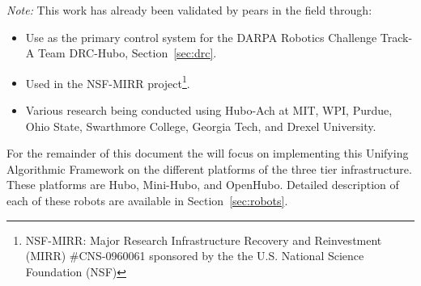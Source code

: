 \noindent \textit{Note:} This work has already been validated by pears in the field through:
\begin{itemize}
\item Use as the primary control system for the DARPA Robotics Challenge Track-A Team DRC-Hubo, Section~\ref{sec:drc}.
\item Used in the NSF-MIRR project\footnote{NSF-MIRR: Major Research Infrastructure Recovery and Reinvestment (MIRR) \#CNS-0960061 sponsored by the the U.S. National Science Foundation (NSF)}.
\item Various research being conducted using Hubo-Ach at MIT, WPI, Purdue, Ohio State, Swarthmore College, Georgia Tech, and Drexel University.
\end{itemize}

For the remainder of this document the will focus on implementing this Unifying Algorithmic Framework on the different platforms of the three tier infrastructure.
These platforms are Hubo, Mini-Hubo, and OpenHubo.  
Detailed description of each of these robots are available in Section~\ref{sec:robots}.







































